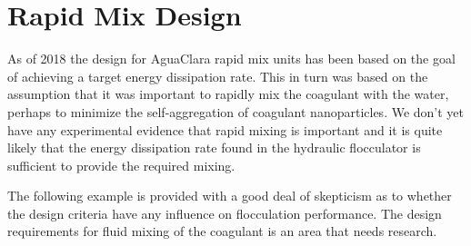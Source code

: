 \documentclass[letterpaper,10pt,english]{sphinxmanual}
\begin{document}
\chapter{Rapid Mix Design}
\label{\detokenize{Rapid_Mix/RM_Design:rapid-mix-design}}\label{\detokenize{Rapid_Mix/RM_Design:title-rapid-mix-design}}\label{\detokenize{Rapid_Mix/RM_Design::doc}}
As of 2018 the design for AguaClara rapid mix units has been based on the goal of achieving a target energy dissipation rate. This in turn was based on the assumption that it was important to rapidly mix the coagulant with the water, perhaps to minimize the self-aggregation of coagulant nanoparticles. We don’t yet have any experimental evidence that rapid mixing is important and it is quite likely that the energy dissipation rate found in the hydraulic flocculator is sufficient to provide the required mixing.

The following example is provided with a good deal of skepticism as to whether the design criteria have any influence on flocculation performance. The design requirements for fluid mixing of the coagulant is an area that needs research.
\end{document}
